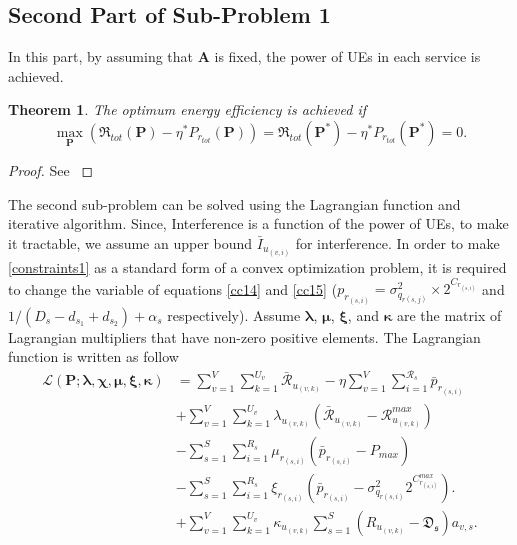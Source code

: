\documentclass[conference]{IEEEtran}
\newtheorem{theorem}{Theorem}
\begin{document}
\subsection{Second Part of Sub-Problem 1}\label{secondsub}
In this part, by assuming that $\boldsymbol{A}$ is fixed, the power of UEs in each service is achieved.
\begin{theorem}\label{t2}
The optimum energy efficiency is achieved if
\begin{equation}\label{q2}
\max \limits_{\boldsymbol{P}} (\mathfrak{R}_{tot}(\boldsymbol{P}) - \eta^* P_{r_{tot}}(\boldsymbol{P}))=
 \mathfrak{R}_{tot}(\boldsymbol{P}^*) - \eta^* P_{r_{tot}}(\boldsymbol{P}^*) =0.
\end{equation}
\end{theorem}
\begin{proof}
See \cite[Appendix A]{aaa}
\end{proof}
The second sub-problem can  be solved using the Lagrangian function and iterative algorithm.
Since, Interference is a function of the power of UEs, to make it tractable, we assume an upper bound $\bar{I}_{u_{(v,i)}}$ for interference. In order to make \eqref{constraints1} as a standard form of a convex optimization problem, it is required to change the variable of equations \eqref{cc14} and \eqref{cc15} ($p_{r_{(s,i)}} = \sigma_{q_{r(s,j)}}^2\times 2^{C_{r_{(s,i)}}}$ and $1/(D_{s}- d_{s_1} + d_{s_2})+\alpha_s$ respectively).
Assume $\boldsymbol{\lambda}$, $\boldsymbol{\mu}$, $\boldsymbol{\xi}$, and $\boldsymbol{ \kappa}$ are the matrix of Lagrangian multipliers that have non-zero positive elements.
The Lagrangian function is written as follow
\begin{subequations}\label{lagrang}
\begin{alignat}{4}
\mathcal{L}(\boldsymbol{P}; \boldsymbol{\lambda}, \boldsymbol{\chi}, \boldsymbol{\mu}, \boldsymbol{ \xi}, \boldsymbol{ \kappa}) & = \sum\limits_{v=1}^{V} \sum\limits_{k=1}^{U_v}\mathcal{\bar{R}}_{u_{(v,k)}}
- \eta \sum\limits_{v=1}^{V} \sum\limits_{i=1}^{\mathcal{R}_s}\bar{p}_{r_{(s,i)}}\\
&+\sum\limits_{v=1}^{V} \sum\limits_{k=1}^{U_v} \lambda_{u_{(v,k)}} (\mathcal{\bar{R}}_{u_{(v,k)}}-\mathcal{R}_{u_{(v,k)}}^{max})\\
&- \sum\limits_{s=1}^{S} \sum\limits_{i=1}^{R_s} \mu_{r_{(s,i)}} (\bar{p}_{r_{(s,i)}}-P_{max})\\
&- \sum\limits_{s=1}^{S} \sum\limits_{i=1}^{R_s} \xi_{r_{(s,i)}} (\bar{p}_{r_{(s,i)}}-\sigma_{q_{r(s,i)}}^2 2^{C_{r_{(s,i)}}^{max}}).\\
&+ \sum\limits_{v=1}^{V} \sum\limits_{k=1}^{U_v} \kappa_{u_{(v,k)}} \sum\limits_{s=1}^{S}(R_{u_{(v,k)}} -\mathfrak{D_s})a_{v,s}.
\end{alignat}
\end{subequations}
\end{document}
